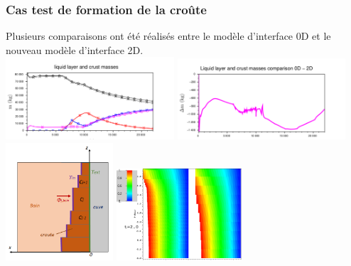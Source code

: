 \documentclass{beamer}
\begin{document}
\begin{frame}[t,noframenumbering]
    \frametitle{Cas test de formation de la croûte}
\footnotesize
    Plusieurs comparaisons ont été réalisés entre le modèle d'interface 0D et le nouveau modèle d'interface 2D.\\
   \includegraphics[width=0.47\textwidth]{Figures/IndustrialTestmasses2.pdf}
    \includegraphics[width=0.47\textwidth]{Figures/IndustrialTestdiffMasses2.pdf}\\

 \center\includegraphics[width=0.3\textwidth]{Figures/modele_croute_0D.png}
 \includegraphics[width=0.35\textwidth]{Figures/Full2D_Bi1_2_t200002.png}
    
\end{frame}
\end{document}
